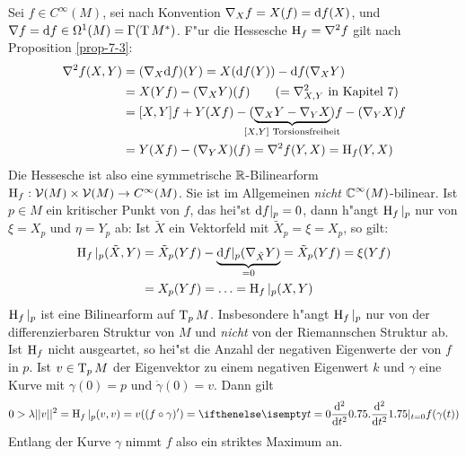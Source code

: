 Sei $f \in C^\infty(M)$, sei nach Konvention $\nabla_X f = X(f) = \mathrm{d} f(X)$, und $\nabla f = \mathrm{d} f \in \Omega^1(M) = \Gamma(\operatorname{T} M^*)$. F"ur die Hessesche $\operatorname{H}_f = \nabla^2 f$ gilt nach Proposition \ref{prop-7-3}:
\begin{align*}
	\nabla^2 f (X,Y) &= (\nabla_X \dop f)(Y) = X(\dop f(Y)) - \dop f(\nabla_X Y)\\
	&= X(Yf) - (\nabla_X Y)(f) \qquad (= \nabla_{X,Y}^2 \text{ in Kapitel 7})\\
	&= [X,Y]f + Y(Xf) - (\underbrace{\nabla_X Y - \nabla_Y X}_{\mathclap{[X,Y] \text{ Torsionsfreiheit}}}) f - (\nabla_Y X) f\\
	&= Y(Xf) - (\nabla_YX)(f) = \nabla^2 f(Y,X) = \Hh_f(Y,X)
\end{align*}
Die Hessesche ist also eine symmetrische $\operatorname{\mathbb{R}}$-Bilinearform $\operatorname{H}_f: \operatorname{\mathcal{V}}(M) \times \operatorname{\mathcal{V}}(M) \to C^\infty(M)$. Sie ist im Allgemeinen \emph{nicht} $\operatorname{\mathbb{C}}^\infty(M)$-bilinear. Ist $p \in M$ ein kritischer Punkt von $f$, das hei"st $\mathrm{d} f|_p = 0$, dann h"angt $\operatorname{H}_f|_p$ nur von $\xi = X_p$ und $\eta = Y_p$ ab: Ist $\tilde X$ ein Vektorfeld mit $\tilde X_p = \xi = X_p$, so gilt:
\begin{align*}
	\operatorname{H}_f|_p(\tilde X,Y) &= \tilde X_p(Yf) - \underbrace{\mathrm{d} f|_p(\nabla_{\tilde X}Y)}_{=0} = \tilde X_p(Yf) = \xi(Yf)\\
	&= X_p(Yf) = \ldots = \operatorname{H}_f|_p(X,Y)
\end{align*}
$\operatorname{H}_f|_p$ ist eine Bilinearform auf $\operatorname{T}_pM$. Insbesondere h"angt $\operatorname{H}_f|_p$ nur von der differenzierbaren Struktur von $M$ und \emph{nicht} von der Riemannschen Struktur ab.
Ist $\operatorname{H}_f$ nicht ausgeartet, so hei"st die Anzahl der negativen Eigenwerte der  von $f$ in $p$.
Ist $v \in \operatorname{T}_pM$ der Eigenvektor zu einem negativen Eigenwert $k$ und $\gamma$ eine Kurve mit $\gamma(0)=p$ und $\dot\gamma(0)=v$. Dann gilt
\begin{align*}
	0 > \lambda || v ||^2 = \Hh_f|_p (v,v) = v((f \circ \gamma)') = \difffrac[t=0]{^2}{t^2} f(\gamma(t))
\end{align*}
Entlang der Kurve $\gamma$ nimmt $f$ also ein striktes Maximum an.
